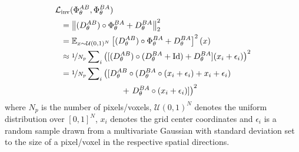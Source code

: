 \documentclass[10pt,twocolumn,letterpaper]{article} %
\begin{document}
\begin{align}
    & \mathcal{L}_{\text{inv}}(\Phi_\theta^{AB},\Phi_\theta^{BA})\\
    & ~~= \left\| (D_\theta^{AB}) \circ \Phi_\theta^{BA}  + D_\theta^{BA} \right\|_2^2 \nonumber \\
    & ~~= \mathbb{E}_{x \sim \mathcal{U}(0,1)^N} \left[(D_\theta^{AB}) \circ \Phi_\theta^{BA}  + D_\theta^{BA}\right]^2(x) \nonumber \\
    & ~~\approx \nicefrac{1}{N_p}\sum\nolimits_{i} \left([(D_\theta^{AB}) \circ (D_\theta^{BA} + \operatorname{Id})  + D_\theta^{BA}] (x_i + \epsilon_i) \right)^2  \nonumber \\
    & ~~= \nicefrac{1}{N_p}\sum\nolimits_{i} \left([D_\theta^{AB} \circ (D_\theta^{BA} \circ (x_i + \epsilon_i) + x_i + \epsilon_i) \right.  \nonumber \\
    & ~~~~~~~~~~~~~~~~~~~~~~~~+ \left. D_\theta^{BA} \circ (x_i + \epsilon_i)]\right)^2 \nonumber
\end{align}
where $N_p$ is the number of pixels/voxels, $\mathcal{U}(0,1)^N$ denotes the uniform distribution over $[0,1]^N$, $x_i$ denotes the grid center coordinates and $\epsilon_i$ is a random sample drawn from a multivariate Gaussian with standard deviation set to the size of a pixel/voxel in the respective spatial directions. 

\end{document}
